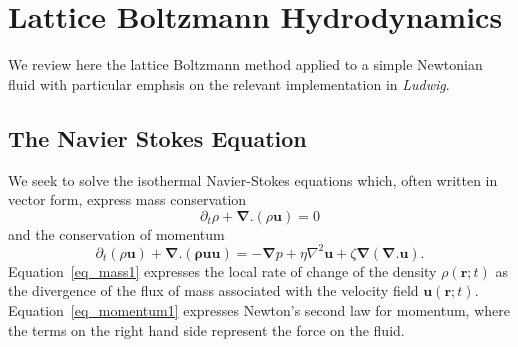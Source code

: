 %
%
%


\section{Lattice Boltzmann Hydrodynamics}
\label{section:lb-hydrodynamics}

We review here the lattice Boltzmann method applied to a simple
Newtonian fluid with particular emphsis on the relevant
implementation in \textit{Ludwig}.

\subsection{The Navier Stokes Equation}

We seek to solve the isothermal Navier-Stokes equations which, often
written in vector form, express mass conservation
\begin{equation}
\partial_t \rho + \boldsymbol{\nabla}.(\rho\mathbf{u}) = 0
\label{eq_mass1}
\end{equation}
and the conservation of momentum
\begin{equation}
\partial_t (\rho\mathbf{u}) + \boldsymbol{\nabla}.(\mathbf{\rho uu}) =
-\boldsymbol{\nabla}p + \eta \nabla^2 \mathbf{u}
+\zeta \boldsymbol{\nabla}(\boldsymbol{\nabla}.\mathbf{u}).
\label{eq_momentum1}
\end{equation}
Equation~\ref{eq_mass1} expresses the local rate of change of the
density $\rho(\mathbf{r}; t)$ as the divergence of the flux of
mass associated with the velocity field $\mathbf{u}(\mathbf{r}; t)$.
Equation~\ref{eq_momentum1} expresses Newton's second law for
momentum, where the terms on the right hand side represent the
force on the fluid.

